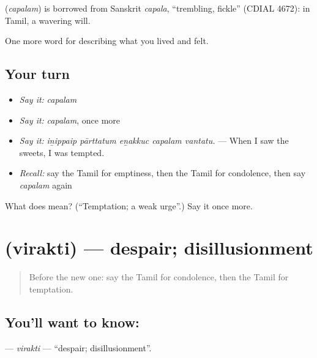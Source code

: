 \begin{cousinweb}
\textbf{} (\emph{capalam}) is borrowed from Sanskrit \emph{capala}, \textquotedblleft{}trembling, fickle\textquotedblright{} (CDIAL 4672): in Tamil, a wavering will.
\end{cousinweb}

\begin{grammarlens}[title={What you've built}]
One more word for describing what you lived and felt.
\end{grammarlens}

\subsection*{Your turn}
\begin{itemize}
\raggedright
  \item \emph{Say it:} \emph{capalam}
  \item \emph{Say it:} \emph{capalam}, once more
  \item \emph{Say it:} \emph{iṉippaip pārttatum eṉakkuc capalam vantatu.} — When I saw the sweets, I was tempted.
  \item \emph{Recall:} say the Tamil for emptiness, then the Tamil for condolence, then say \emph{capalam} again
\end{itemize}

\begin{tcolorbox}[breakable,colback=teal!4,colframe=teal!35!black,title={Before you move on}]
What does  mean? (\textquotedblleft{}Temptation; a weak urge\textquotedblright{}.) Say it once more.
\end{tcolorbox}
\section[\texorpdfstring{\ta{விரக்தி} (virakti)}{விரக்தி (virakti)}]{ (virakti) — despair; disillusionment}

\label{lesson:TA-C464-virakti}



\begin{quote}
Before the new one: say the Tamil for condolence, then the Tamil for temptation.
\end{quote}

\subsection*{You'll want to know: }
\textbf{} — \emph{virakti} — \textquotedblleft{}despair; disillusionment\textquotedblright{}.

